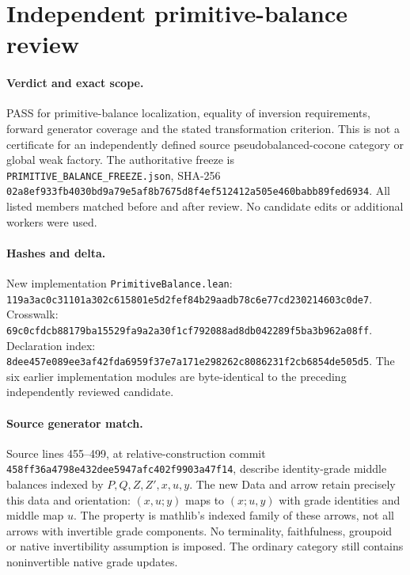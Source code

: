\documentclass{article}
\begin{document}
\section*{Independent primitive-balance review}
\paragraph{Verdict and exact scope.} PASS for primitive-balance localization, equality of inversion requirements, forward generator coverage and the stated transformation criterion. This is not a certificate for an independently defined source pseudobalanced-cocone category or global weak factory. The authoritative freeze is \texttt{PRIMITIVE\_BALANCE\_FREEZE.json}, SHA-256 \texttt{02a8ef933fb4030bd9a79e5af8b7675d8f4ef512412a505e460babb89fed6934}. All listed members matched before and after review. No candidate edits or additional workers were used.
\paragraph{Hashes and delta.} New implementation \texttt{PrimitiveBalance.lean}: \texttt{119a3ac0c31101a302c615801e5d2fef84b29aadb78c6e77cd230214603c0de7}. Crosswalk: \texttt{69c0cfdcb88179ba15529fa9a2a30f1cf792088ad8db042289f5ba3b962a08ff}. Declaration index: \texttt{8dee457e089ee3af42fda6959f37e7a171e298262c8086231f2cb6854de505d5}. The six earlier implementation modules are byte-identical to the preceding independently reviewed candidate.
\paragraph{Source generator match.} Source lines 455--499, at relative-construction commit \texttt{458ff36a4798e432dee5947afc402f9903a47f14}, describe identity-grade middle balances indexed by $P,Q,Z,Z',x,u,y$. The new Data and arrow retain precisely this data and orientation: $(x,u;y)$ maps to $(x;u,y)$ with grade identities and middle map $u$. The property is mathlib's indexed family of these arrows, not all arrows with invertible grade components. No terminality, faithfulness, groupoid or native invertibility assumption is imposed. The ordinary category still contains noninvertible native grade updates.
\end{document}
